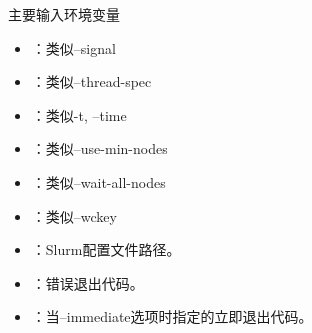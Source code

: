 \begin{frame}{主要输入环境变量}
\begin{itemize}
	\item {}：类似--signal
	\item {}：类似--thread-spec
	\item {}：类似-t, --time
	\item {}：类似--use-min-nodes
	\item {}：类似--wait-all-nodes
	\item {}：类似--wckey
	\item {}：Slurm配置文件路径。
	\item {}：错误退出代码。
	\item {}：当--immediate选项时指定的立即退出代码。
\end{itemize}
\end{frame}

